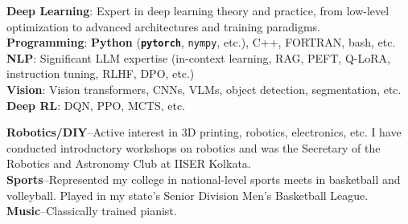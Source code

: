 \documentclass[10pt,a4paper]{article}
\begin{document}

\spacedhrule{1em}{-0.4em}


  \textbf{Deep Learning}: Expert in deep learning theory and practice, from low-level optimization to advanced architectures and training paradigms.\\
  \textbf{Programming}: \textbf{Python} (\textbf{\texttt{pytorch}}, \texttt{nympy}, etc.), C++, FORTRAN, bash, etc.\\
  \textbf{NLP}: Significant LLM expertise (in-context learning, RAG, PEFT, Q-LoRA, instruction tuning, RLHF, DPO, etc.)\\
  \textbf{Vision}: Vision transformers, CNNs, VLMs, object detection, segmentation, etc.\\
  \textbf{Deep RL}: DQN, PPO, MCTS, etc. \\

\spacedhrule{1em}{-0.4em}


	  \textbf{Robotics/DIY}--Active interest in 3D printing,
     robotics, electronics, etc. I have conducted introductory workshops on
     robotics and was the Secretary of the Robotics and Astronomy Club at IISER
     Kolkata.\\
	  \textbf{Sports}--Represented my college in national-level sports
     meets in basketball and volleyball. Played in my state's Senior Division
     Men's Basketball League.\\
	  \textbf{Music}--Classically trained pianist.\\

\spacedhrule{1em}{-0.4em}
\end{document}
